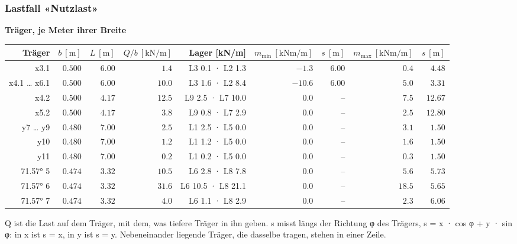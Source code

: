 \documentclass[11pt,a4paper]{article}
\begin{document}
\subsubsection{Lastfall «Nutzlast»}
\noindent\textbf{Träger, je Meter ihrer Breite}
\begin{longtable}{rrrrrrrrr}
\hline
Träger & $b\ [\mathrm{m}]$ & $L\ [\mathrm{m}]$ & $Q/b\ [\mathrm{kN/m}]$ & Lager [kN/m] & $m_{\min}\ [\mathrm{kNm/m}]$ & $s\ [\mathrm{m}]$ & $m_{\max}\ [\mathrm{kNm/m}]$ & $s\ [\mathrm{m}]$ \\
\hline
\endhead
x3.1 & $0.500$ & $6.00$ & $1.4$ & L3 0.1 · L2 1.3 & $-1.3$ & $6.00$ & $0.4$ & $4.48$ \\
x4.1 … x6.1 & $0.500$ & $6.00$ & $10.0$ & L3 1.6 · L2 8.4 & $-10.6$ & $6.00$ & $5.0$ & $3.31$ \\
x4.2 & $0.500$ & $4.17$ & $12.5$ & L9 2.5 · L7 10.0 & $0.0$ & – & $7.5$ & $12.67$ \\
x5.2 & $0.500$ & $4.17$ & $3.8$ & L9 0.8 · L7 2.9 & $0.0$ & – & $2.5$ & $12.80$ \\
y7 … y9 & $0.480$ & $7.00$ & $2.5$ & L1 2.5 · L5 0.0 & $0.0$ & – & $3.1$ & $1.50$ \\
y10 & $0.480$ & $7.00$ & $1.2$ & L1 1.2 · L5 0.0 & $0.0$ & – & $1.6$ & $1.50$ \\
y11 & $0.480$ & $7.00$ & $0.2$ & L1 0.2 · L5 0.0 & $0.0$ & – & $0.3$ & $1.50$ \\
71.57° 5 & $0.474$ & $3.32$ & $10.5$ & L6 2.8 · L8 7.8 & $0.0$ & – & $5.6$ & $5.73$ \\
71.57° 6 & $0.474$ & $3.32$ & $31.6$ & L6 10.5 · L8 21.1 & $0.0$ & – & $18.5$ & $5.65$ \\
71.57° 7 & $0.474$ & $3.32$ & $4.0$ & L6 1.1 · L8 2.9 & $0.0$ & – & $2.3$ & $6.06$ \\
\hline
\end{longtable}
Q ist die Last auf dem Träger, mit dem, was tiefere Träger in ihn geben. s misst längs der Richtung φ des Trägers, s = x · cos φ + y · sin φ: in x ist s = x, in y ist s = y. Nebeneinander liegende Träger, die dasselbe tragen, stehen in einer Zeile.
\end{document}

